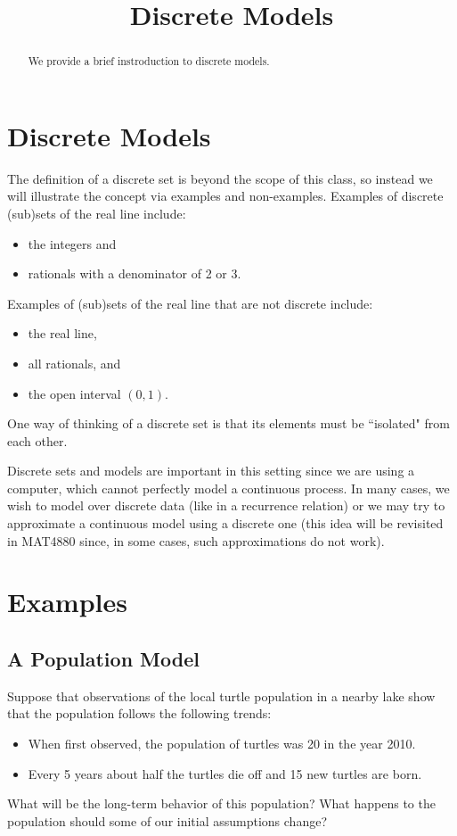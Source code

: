 \documentclass{ximera}
\title{Discrete Models}
\begin{document}
  
\begin{abstract}  
We provide a brief instroduction to discrete models.
\end{abstract}  
\maketitle

\section{Discrete Models}

The definition of a discrete set is beyond the scope of this class, so
instead we will illustrate the concept via examples and non-examples. Examples
of discrete (sub)sets of the real line include:
\begin{itemize}
	\item the integers and
	\item rationals with a denominator of 2 or 3.
\end{itemize}
Examples of (sub)sets of the real line that are not discrete include:
\begin{itemize}
	\item the real line,
	\item all rationals, and
	\item the open interval $(0,1)$.
\end{itemize}
One way of thinking of a discrete set is that its elements must be
``isolated" from each other. 

Discrete sets and models are important in 
this setting since we are using a computer, which cannot perfectly model
a continuous process. In many cases, we wish to model over discrete data
(like in a recurrence relation) or we may try to approximate a 
continuous model using a discrete one (this idea will be revisited in 
MAT4880 since, in some cases, such approximations do not work).

\section{Examples}

\subsection{A Population Model}

Suppose that observations of the local turtle population in a nearby 
lake show that the population follows the following trends:
\begin{itemize}
	\item When first observed, the population of turtles was 20
	in the year 2010.
	\item Every 5 years about half the turtles die off and 15
	new turtles are born.
\end{itemize}
What will be the long-term behavior of this population? What happens
to the population should some of our initial assumptions change?
\end{document}
